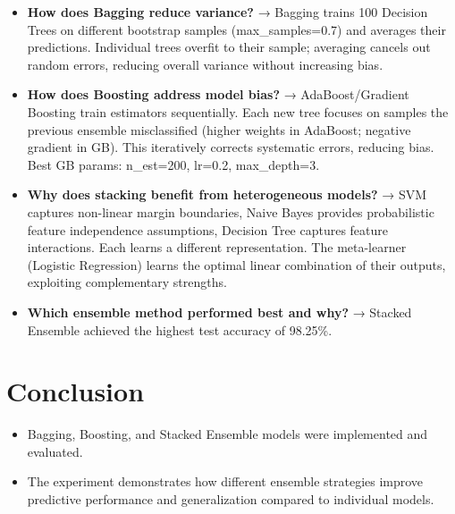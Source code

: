 \documentclass[11pt]{article}
\begin{document}
\begin{itemize}

\item \textbf{How does Bagging reduce variance?}
→ Bagging trains 100 Decision Trees on different bootstrap samples
      (max\_samples=0.7) and averages their predictions.
      Individual trees overfit to their sample; averaging cancels out
      random errors, reducing overall variance without increasing bias.

\item \textbf{How does Boosting address model bias?}
 → AdaBoost/Gradient Boosting train estimators sequentially. Each new
      tree focuses on samples the previous ensemble misclassified (higher
      weights in AdaBoost; negative gradient in GB). This iteratively
      corrects systematic errors, reducing bias. Best GB params:
      n\_est=200, lr=0.2, max\_depth=3.
      
\item \textbf{Why does stacking benefit from heterogeneous models?}
→ SVM captures non-linear margin boundaries, Naive Bayes provides
      probabilistic feature independence assumptions, Decision Tree
      captures feature interactions. Each learns a different representation.
      The meta-learner (Logistic Regression) learns the optimal linear
      combination of their outputs, exploiting complementary strengths.


\item \textbf{Which ensemble method performed best and why?}
 → Stacked Ensemble achieved the highest test accuracy of
      98.25\%.

\end{itemize}


\section{Conclusion}
\begin{itemize}

\item Bagging, Boosting, and Stacked Ensemble models were implemented and evaluated.  
\item The experiment demonstrates how different ensemble strategies improve predictive performance and generalization compared to individual models.
\end{itemize}
\end{document}
